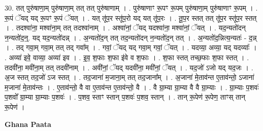\documentclass[17pt]{extarticle}
\begin{document}
30. तत् पुरु॑षाणा॒म् पुरु॑षाणा॒म् तत् तत् पुरु॑षाणाम् । . पुरु॑षाणाꣳ रू॒पꣳ रू॒पम् पुरु॑षाणा॒म् पुरु॑षाणाꣳ रू॒पम् । . रू॒पं ॅयद् यद् रू॒पꣳ रू॒पं ॅयत् । . यत् तू॑प॒र स्तू॑प॒रो यद् यत् तू॑प॒रः । . तू॒प॒र स्तत् तत् तू॑प॒र स्तू॑प॒र स्तत् । . तदश्वा॑ना॒ मश्वा॑ना॒म् तत् तदश्वा॑नाम् । . अश्वा॑नां॒ ॅयद् यदश्वा॑ना॒ मश्वा॑नां॒ ॅयत् । . यद॒न्यतो॑दन् न॒न्यतो॑द॒न्॒. यद् यद॒न्यतो॑दन्न् । . अ॒न्यतो॑द॒न् तत् तद॒न्यतो॑दन् न॒न्यतो॑द॒न् तत् । . अ॒न्यतो॑द॒न्नित्य॒न्यतः॑ - द॒न्न् । . तद् गवा॒म् गवा॒म् तत् तद् गवा᳚म् । . गवां॒ ॅयद् यद् गवा॒म् गवां॒ ॅयत् । . यदव्या॒ अव्या॒ यद् यदव्याः᳚ । . अव्या॑ इवे॒ वाव्या॒ अव्या॑ इव । . इ॒व॒ श॒फाः श॒फा इ॑वे व श॒फाः । . श॒फा स्तत् तच्छ॒फाः श॒फा स्तत् । . तदवी॑ना॒ मवी॑ना॒म् तत् तदवी॑नाम् । . अवी॑नां॒ ॅयद् यदवी॑ना॒ मवी॑नां॒ ॅयत् । . यद॒जो॑ ऽजो यद् यद॒जः । . अ॒ज स्तत् तद॒जो॑ ऽज स्तत् । . तद॒जाना॑ म॒जाना॒म् तत् तद॒जाना᳚म् । . अ॒जाना॑ मे॒ताव॑न्त ए॒ताव॑न्तो॒ ऽजाना॑ म॒जाना॑ मे॒ताव॑न्तः । . ए॒ताव॑न्तो॒ वै वा ए॒ताव॑न्त ए॒ताव॑न्तो॒ वै । . वै ग्रा॒म्या ग्रा॒म्या वै वै ग्रा॒म्याः । . ग्रा॒म्याः प॒शवः॑ प॒शवो᳚ ग्रा॒म्या ग्रा॒म्याः प॒शवः॑ । . प॒शव॒ स्ताꣳ स्तान् प॒शवः॑ प॒शव॒ स्तान् । . तान् रू॒पेण॑ रू॒पेण॒ ताꣳस् तान् रू॒पेण॑ । \newline

\textbf{Ghana Paata } \newline
\end{document}
